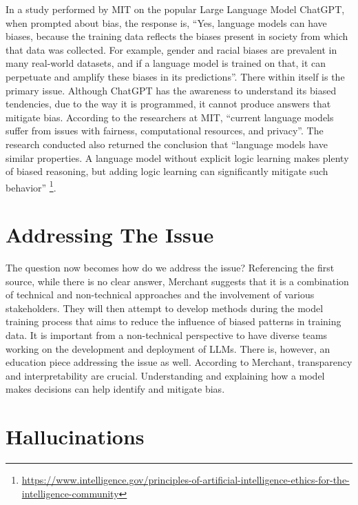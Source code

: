 \documentclass[
]{book}
\begin{document}
In a study performed by MIT on the popular Large Language Model ChatGPT, when prompted about bias, the response is, ``Yes, language models can have biases, because the training data reflects the biases present in society from which that data was collected. For example, gender and racial biases are prevalent in many real-world datasets, and if a language model is trained on that, it can perpetuate and amplify these biases in its predictions''. There within itself is the primary issue. Although ChatGPT has the awareness to understand its biased tendencies, due to the way it is programmed, it cannot produce answers that mitigate bias. According to the researchers at MIT, ``current language models suffer from issues with fairness, computational resources, and privacy''. The research conducted also returned the conclusion that ``language models have similar properties. A language model without explicit logic learning makes plenty of biased reasoning, but adding logic learning can significantly mitigate such behavior'' \footnote{\url{https://www.intelligence.gov/principles-of-artificial-intelligence-ethics-for-the-intelligence-community}}.

\hypertarget{addressing-the-issue}{%
\section{Addressing The Issue}\label{addressing-the-issue}}

The question now becomes how do we address the issue? Referencing the first source, while there is no clear answer, Merchant suggests that it is a combination of technical and non-technical approaches and the involvement of various stakeholders. They will then attempt to develop methods during the model training process that aims to reduce the influence of biased patterns in training data. It is important from a non-technical perspective to have diverse teams working on the development and deployment of LLMs. There is, however, an education piece addressing the issue as well. According to Merchant, transparency and interpretability are crucial. Understanding and explaining how a model makes decisions can help identify and mitigate bias.

\hypertarget{hallucinations}{%
\section{Hallucinations}\label{hallucinations}}
\end{document}
